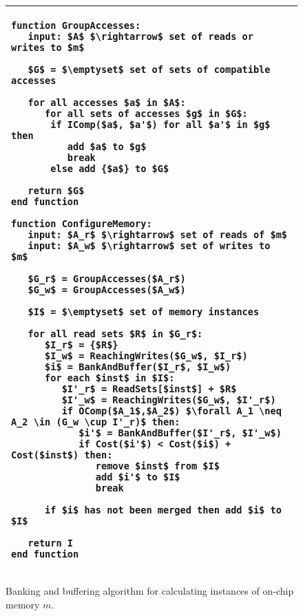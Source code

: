 \begin{figure}
\hspace{5pt}
\begin{tabular}{l}
\hline\hline

{\begin{lstlisting}[language=Pseudo,linewidth=0.98\columnwidth, mathescape=true]
function GroupAccesses:
   input: $A$ $\rightarrow$ set of reads or writes to $m$
   
   $G$ = $\emptyset$ set of sets of compatible accesses
   
   for all accesses $a$ in $A$:
      for all sets of accesses $g$ in $G$:
       if IComp($a$, $a'$) for all $a'$ in $g$ then
          add $a$ to $g$
          break
       else add {$a$} to $G$
   
   return $G$
end function

function ConfigureMemory:
   input: $A_r$ $\rightarrow$ set of reads of $m$
   input: $A_w$ $\rightarrow$ set of writes to $m$
   
   $G_r$ = GroupAccesses($A_r$)
   $G_w$ = GroupAccesses($A_w$)
   
   $I$ = $\emptyset$ set of memory instances
   
   for all read sets $R$ in $G_r$: 
      $I_r$ = {$R$}
      $I_w$ = ReachingWrites($G_w$, $I_r$)
      $i$ = BankAndBuffer($I_r$, $I_w$)
      for each $inst$ in $I$:
         $I'_r$ = ReadSets[$inst$] + $R$
         $I'_w$ = ReachingWrites($G_w$, $I'_r$)
         if OComp($A_1$,$A_2$) $\forall A_1 \neq A_2 \in (G_w \cup I'_r)$ then:
            $i'$ = BankAndBuffer($I'_r$, $I'_w$)
            if Cost($i'$) < Cost($i$) + Cost($inst$) then:
               remove $inst$ from $I$
               add $i'$ to $I$
               break

      if $i$ has not been merged then add $i$ to $I$ 

   return I
end function
\end{lstlisting}}\\
\hline
\end{tabular}
\vspace{-10pt}
\caption{Banking and buffering algorithm for calculating instances of on-chip memory $m$.
\vspace{-10pt}
}
\label{fig:bank_alg}
\end{figure}


